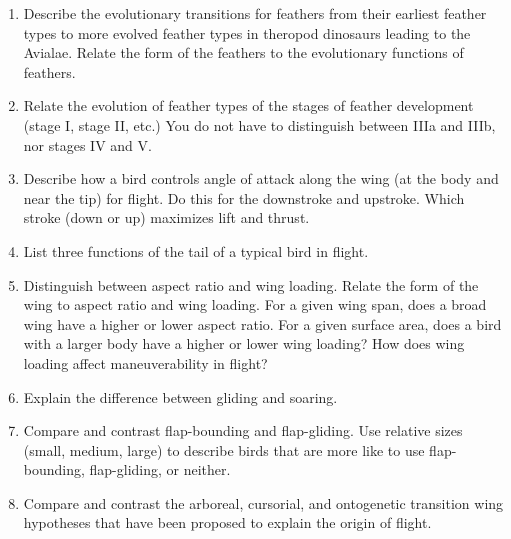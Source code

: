 \documentclass[nofonts, letterpaper]{tufte-handout}
\begin{document}
\begin{enumerate}

\item Describe the evolutionary transitions for feathers from their earliest feather types to more evolved feather types in theropod dinosaurs leading to the Avialae. Relate the form of the feathers to the evolutionary functions of feathers.

\item Relate the evolution of feather types of the stages of feather development (stage I, stage II, etc.) You do not have to distinguish between IIIa and IIIb, nor stages IV and V.

\item Describe how a bird controls angle of attack along the wing (at the body and near the tip) for flight. Do this for the downstroke and upstroke. Which stroke (down or up) maximizes lift and thrust. 

\item List three functions of the tail of a typical bird in flight. 

\item Distinguish between aspect ratio and wing loading. Relate the form of the wing to aspect ratio and wing loading. For a given wing span, does a broad wing have a higher or lower aspect ratio.  For a given surface area, does a bird with a larger body have a higher or lower wing loading? How does wing loading affect maneuverability in flight?

\item Explain the difference between gliding and soaring.

\item Compare and contrast flap-bounding and flap-gliding. Use relative sizes (small, medium, large) to describe birds that are more like to use flap-bounding, flap-gliding, or neither.

\item Compare and contrast the arboreal, cursorial, and ontogenetic transition wing hypotheses that have been proposed to explain the origin of flight.




\end{enumerate}
\end{document}

